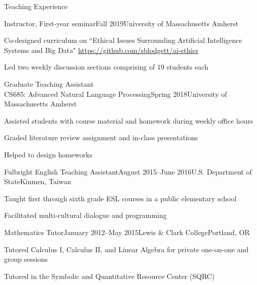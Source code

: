 \documentclass{resume} %
\begin{document}
\begin{rSection}{Teaching Experience}

\begin{rSubsection}{Instructor, First-year seminar}{Fall 2019}{University of Massachusetts Amherst}{}
\item Co-designed curriculum on ``Ethical Issues Surrounding Artificial Intelligence Systems and Big Data" \url{https://github.com/sblodgett/ai-ethics}
\item Led two weekly discussion sections comprising of 19 students each 
\end{rSubsection}

\begin{rSubsection}{Graduate Teaching Assistant \\ CS685: Advanced Natural Language Processing}{Spring 2018}{University of Massachusetts Amherst}{}
\item Assisted students with course material and homework during weekly office hours
\item Graded literature review assignment and in-class presentations 
\item Helped to design homeworks
\end{rSubsection}

\begin{rSubsection}{Fulbright English Teaching Assistant}{August 2015--June 2016}{U.S. Department of State}{Kinmen, Taiwan}
\item Taught first through sixth grade ESL courses in a public elementary school
\item Facilitated multi-cultural dialogue and programming
\end{rSubsection}

\begin{rSubsection}{Mathematics Tutor}{January 2012--May 2015}{Lewis \& Clark College}{Portland, OR}
\item Tutored Calculus I, Calculus II, and Linear Algebra for private one-on-one and group sessions
\item Tutored in the Symbolic and Quantitative Resource Center (SQRC) 
\end{rSubsection}

\end{rSection}

\end{document}
